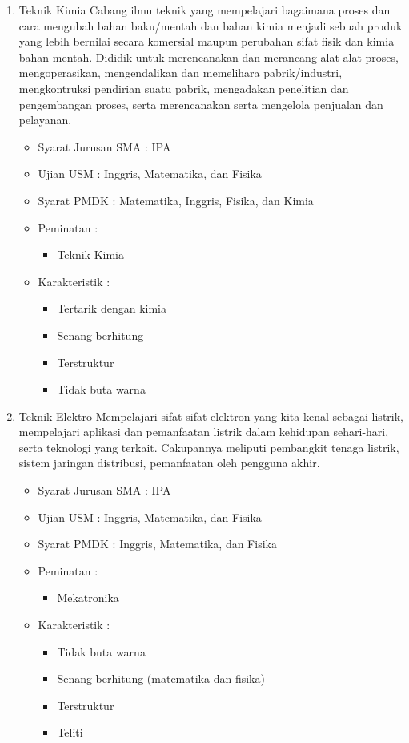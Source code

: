 \documentclass[a4paper,twoside]{article}
\begin{document}
\begin{enumerate}
\begin{enumerate}
\begin{enumerate}
				\item Teknik Kimia
					Cabang ilmu teknik yang mempelajari bagaimana proses dan cara mengubah bahan baku/mentah dan bahan kimia menjadi sebuah produk yang lebih bernilai secara komersial maupun perubahan sifat fisik dan kimia bahan mentah. Dididik untuk merencanakan dan merancang alat-alat proses, mengoperasikan, mengendalikan dan memelihara pabrik/industri, mengkontruksi pendirian suatu pabrik, mengadakan penelitian dan pengembangan proses, serta merencanakan serta mengelola penjualan dan pelayanan.
					\begin{itemize}
						\item Syarat Jurusan SMA : IPA
						\item Ujian USM : Inggris, Matematika, dan Fisika
						\item Syarat PMDK : Matematika, Inggris, Fisika, dan Kimia
						\item Peminatan :
						\begin{itemize}
							\item Teknik Kimia
						\end{itemize}
						\item Karakteristik :
						\begin{itemize}
							\item Tertarik dengan kimia
							\item Senang berhitung
							\item Terstruktur
							\item Tidak buta warna
						\end{itemize}
					\end{itemize}
					
				\item Teknik Elektro
					Mempelajari sifat-sifat elektron yang kita kenal sebagai listrik, mempelajari aplikasi dan pemanfaatan listrik dalam kehidupan sehari-hari, serta teknologi yang terkait. Cakupannya meliputi pembangkit tenaga listrik, sistem jaringan distribusi, pemanfaatan oleh pengguna akhir.
					\begin{itemize}
						\item Syarat Jurusan SMA : IPA
						\item Ujian USM : Inggris, Matematika, dan Fisika
						\item Syarat PMDK :  Inggris, Matematika, dan Fisika
						\item Peminatan :
						\begin{itemize}
							\item Mekatronika
						\end{itemize}
						\item Karakteristik :
						\begin{itemize}
							\item Tidak buta warna
							\item Senang berhitung (matematika dan fisika)
							\item Terstruktur
							\item Teliti
						\end{itemize}
					\end{itemize}
			\end{enumerate}
			

\end{enumerate}
\end{enumerate}
\end{document}
